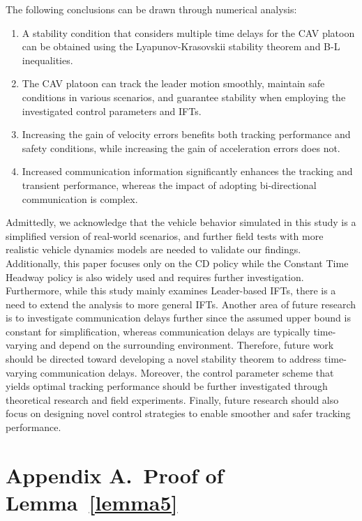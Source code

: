 \documentclass[a4paper]{cas-sc}
\begin{document}
The following conclusions can be drawn through numerical analysis:
\begin{enumerate}
  \item A stability condition that considers multiple time delays for the CAV platoon can be obtained using the Lyapunov-Krasovskii stability theorem and B-L inequalities.
  \item The CAV platoon can track the leader motion smoothly, maintain safe conditions in various scenarios, and guarantee stability when employing the investigated control parameters and IFTs.
  \item Increasing the gain of velocity errors benefits both tracking performance and safety conditions, while increasing the gain of acceleration errors does not.
  \item Increased communication information significantly enhances the tracking and transient performance, whereas the impact of adopting bi-directional communication is complex.
\end{enumerate}

Admittedly, we acknowledge that the vehicle behavior simulated in this study is a simplified version of real-world scenarios, and further field tests with more realistic vehicle dynamics models are needed to validate our findings. Additionally, this paper focuses only on the CD policy while the Constant Time Headway policy is also widely used and requires further investigation. Furthermore, while this study mainly examines Leader-based IFTs, there is a need to extend the analysis to more general IFTs. Another area of future research is to investigate communication delays further since the assumed upper bound is constant for simplification, whereas communication delays are typically time-varying and depend on the surrounding environment. Therefore, future work should be directed toward developing a novel stability theorem to address time-varying communication delays. Moreover, the control parameter scheme that yields optimal tracking performance should be further investigated through theoretical research and field experiments. Finally, future research should also focus on designing novel control strategies to enable smoother and safer tracking performance.



\appendix


\section*{Appendix A.~Proof of Lemma~\ref{lemma5}}
\label{AppendixA}
\end{document}
